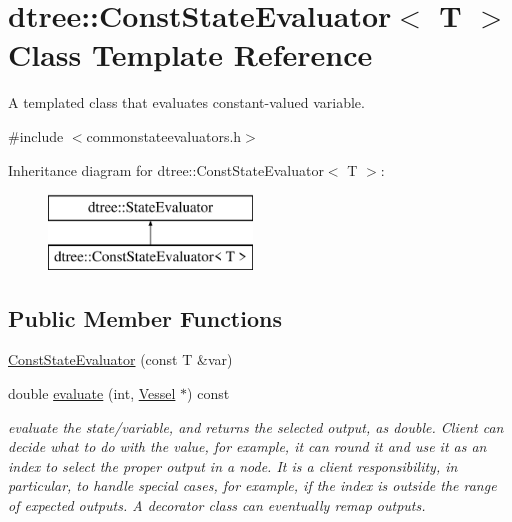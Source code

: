 \hypertarget{classdtree_1_1_const_state_evaluator}{}\section{dtree\+::Const\+State\+Evaluator$<$ T $>$ Class Template Reference}
\label{classdtree_1_1_const_state_evaluator}


A templated class that evaluates constant-\/valued variable.  




{\ttfamily \#include $<$commonstateevaluators.\+h$>$}

Inheritance diagram for dtree\+::Const\+State\+Evaluator$<$ T $>$\+:\begin{figure}[H]
\begin{center}
\leavevmode
\includegraphics[height=2.000000cm]{dd/d32/classdtree_1_1_const_state_evaluator}
\end{center}
\end{figure}
\subsection*{Public Member Functions}
\begin{DoxyCompactItemize}
\item 
\mbox{\hyperlink{classdtree_1_1_const_state_evaluator_a0f5769321b5312ed6d371ed157d25ff6}{Const\+State\+Evaluator}} (const T \&var)
\item 
double \mbox{\hyperlink{classdtree_1_1_const_state_evaluator_aaa06b99c86b4390cfdcdcfc43f210eb6}{evaluate}} (int, \mbox{\hyperlink{class_vessel}{Vessel}} $\ast$) const
\begin{DoxyCompactList}\small\item\em evaluate the state/variable, and returns the selected output, as double. Client can decide what to do with the value, for example, it can round it and use it as an index to select the proper output in a node. It is a client responsibility, in particular, to handle special cases, for example, if the index is outside the range of expected outputs. A decorator class can eventually remap outputs. \end{DoxyCompactList}\end{DoxyCompactItemize}


